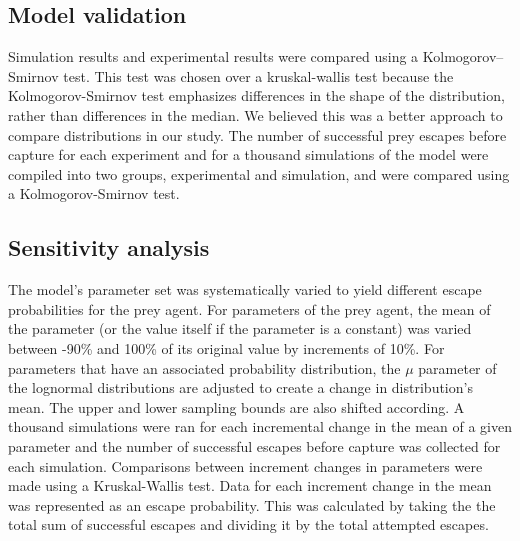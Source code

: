 \documentclass[]{rsos}%
\begin{document}
\subsection{Model validation}
Simulation results and experimental results were compared using a Kolmogorov–Smirnov test. This test was chosen over a kruskal-wallis test because the Kolmogorov-Smirnov test emphasizes differences in the shape of the distribution, rather than differences in the median. We believed this was a better approach to compare distributions in our study. The number of successful prey escapes before capture for each experiment and for a thousand simulations of the model were compiled into two groups, experimental and simulation, and were compared using a Kolmogorov-Smirnov test.

\subsection{Sensitivity analysis}
The model’s parameter set was systematically varied to yield different escape probabilities for the prey agent. For parameters of the prey agent, the mean of the parameter (or the value itself if the parameter is a constant) was varied between -90\% and 100\% of its original value by increments of 10\%. For parameters that have an associated probability distribution, the $\mu$ parameter of the lognormal distributions are adjusted to create a change in distribution’s mean. The upper and lower sampling bounds are also shifted according. A thousand simulations were ran for each incremental change in the mean of a given parameter and  the number of successful escapes before capture was collected  for each simulation. Comparisons between increment changes in parameters were made using a Kruskal-Wallis test. Data for each increment change in the mean was represented as an escape probability. This was calculated by taking the the total sum of successful escapes and dividing it by the total attempted escapes.
\end{document}
